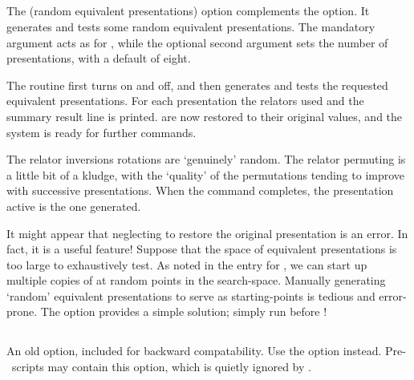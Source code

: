 \subsection{}

The  (random equivalent presentations) option complements the
   option.
It generates and tests some random equivalent presentations.
The mandatory argument acts as for , while the optional second
  argument sets the number of presentations, with a default of eight.

The routine first turns  on and  off, and then 
  generates and tests the requested equivalent presentations.
For each presentation the relators used and the summary result line is
  printed.
 \amp {} are now restored to their original values, and 
  the system is ready for further commands.

The relator inversions \amp rotations are `genuinely' random.
The relator permuting is a little bit of a kludge, with the `quality' of
  the permutations tending to improve with successive presentations. 
When the  command completes, the presentation active is the 
   one generated.

It might appear that neglecting to restore the original presentation is an
  error.
In fact, it is a useful feature!
Suppose that the space of equivalent presentations is too large to
  exhaustively test.
As noted in the entry for , we can start up multiple copies of
   at random points in the search-space.
Manually generating `random' equivalent presentations to serve as
  starting-points is tedious and error-prone.
The  option provides a simple solution; simply run 
  before !

\subsection{}

An old option, included for backward compatability.
Use the  option instead.
Pre-\acet\ scripts may contain this option, which is quietly ignored
  by \acet.

\subsection{}

